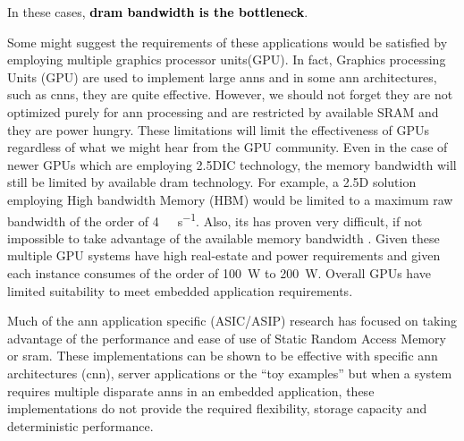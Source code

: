 In these cases, \textbf{\textcolor{black}{\ac{dram} bandwidth is the bottleneck}}.
\fi



\iffalse
So considering the performance improvements observed in other applications, it is expected that many customer facing or embedded applications will implement multiple instances of artificial neural networks to perform various functions.
have very large memory and processing requirements.
require multiple instances of \ac{ann}s of similar size to the \ac{ann} described in \cite{krizhevsky2012imagenet}.

For example employing multiple cameras or monitoring and controlling different systems in a drone, a automobile each with an image recognition \ac{ann}\cite{krizhevsky2012imagenet}\cite{bojarski2016end} for navigation, engine monitoring along with other system control.
\fi

\iffalse
Some might suggest the requirements of these applications would be satisfied by employing multiple graphics processor units(GPU).
In fact, Graphics processing Units (GPU) are used to implement large \ac{ann}s and in some \ac{ann} architectures, such as \acp{cnn}, they are quite effective. However, we should not forget they are not optimized purely for \ac{ann} processing and are restricted by available SRAM and they are power hungry. These limitations will limit the effectiveness of GPUs regardless of what we might hear from the GPU community.
Even in the case of newer GPUs which are employing 2.5DIC technology, the memory bandwidth will still be limited by available \ac{dram} technology.
For example, a 2.5D solution employing High bandwidth Memory (HBM) would be limited to a maximum raw bandwidth of the order of \SI[per-mode=symbol]{4}{\tera \bit \per \second}.
Also, its has proven very difficult, if not impossible to take advantage of the available memory bandwidth \cite{farabet2011neuflow} \cite{tensorflow2015-whitepaper}.
Given these multiple GPU systems have high real-estate and power requirements and given each instance consumes of the order of \SI{100}{\watt} to \SI{200}{\watt}.
Overall GPUs have limited suitability to meet embedded application requirements.


Much of the \ac{ann} application specific (ASIC/ASIP) research has focused on taking advantage of the performance and ease of use of Static Random Access Memory or \ac{sram}. 
These implementations can be shown to be effective with specific \ac{ann} architectures (\ac{cnn}), server applications or the ``toy examples'' but when a system requires multiple disparate \ac{ann}s in an embedded application, these implementations do not provide the required flexibility, storage capacity and deterministic performance.

